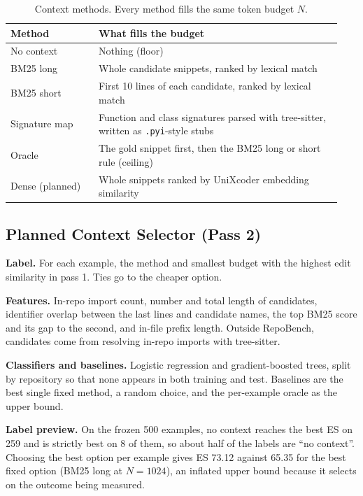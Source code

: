 \documentclass[10pt,twocolumn,letterpaper]{article}
\begin{document}
\begin{table}[t]
\begin{center}
\small
\setlength{\tabcolsep}{3pt}
\begin{tabular}{|p{0.25\linewidth}|p{0.69\linewidth}|}
\hline
Method & What fills the budget \\
\hline\hline
No context & Nothing (floor) \\
BM25 long & Whole candidate snippets, ranked by lexical match \\
BM25 short & First 10 lines of each candidate, ranked by lexical match \\
Signature map & Function and class signatures parsed with tree-sitter, written as \texttt{.pyi}-style stubs \\
Oracle & The gold snippet first, then the BM25 long or short rule (ceiling) \\
Dense (planned) & Whole snippets ranked by UniXcoder embedding similarity \\
\hline
\end{tabular}
\end{center}
\caption{Context methods. Every method fills the same token budget $N$.}
\label{tab:methods}
\end{table}

\subsection{Planned Context Selector (Pass 2)}
\label{sec:selector}

\textbf{Label.} For each example, the method and smallest budget with the highest edit
similarity in pass 1. Ties go to the cheaper option.

\textbf{Features.} In-repo import count, number and total length of candidates, identifier
overlap between the last lines and candidate names, the top BM25 score and its gap to the
second, and in-file prefix length. Outside RepoBench, candidates come from resolving in-repo
imports with tree-sitter.

\textbf{Classifiers and baselines.} Logistic regression and gradient-boosted trees, split by
repository so that none appears in both training and test. Baselines are the best single fixed
method, a random choice, and the per-example oracle as the upper bound.

\textbf{Label preview.} On the frozen 500 examples, no context reaches the best ES on 259 and
is strictly best on 8 of them, so about half of the labels are ``no context''. Choosing the
best option per example gives ES 73.12 against 65.35 for the best fixed option (BM25 long at
$N=1024$), an inflated upper bound because it selects on the outcome being measured.
\end{document}
